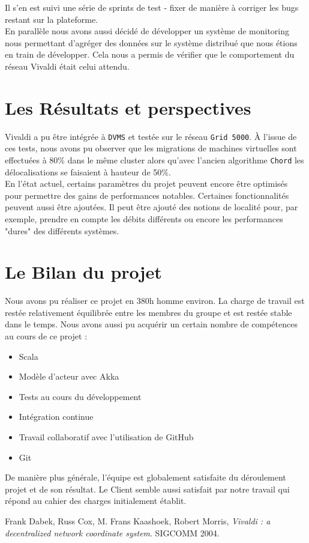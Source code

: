\documentclass[11pt,a4paper]{article}
\begin{document}
Il s'en est suivi une série de sprints de test - fixer de manière à corriger les bugs restant sur la plateforme.\\

En parallèle nous avons aussi décidé de développer un système de monitoring nous permettant d'agréger des données sur le système distribué que nous étions en train de développer. Cela nous a permis de vérifier que le comportement du réseau Vivaldi était celui attendu.

\section{Les Résultats et perspectives}
Vivaldi a pu être intégrée à \texttt{DVMS} et testée sur le réseau \texttt{Grid 5000}. À l'issue de ces tests, nous avons pu observer que les migrations de machines virtuelles sont effectuées à 80\% dans le même cluster alors qu'avec l'ancien algorithme \texttt{Chord} les délocalisations se faisaient à hauteur de 50\%.\\

En l'état actuel, certains paramètres du projet peuvent encore être optimisés pour permettre des gains de performances notables. Certaines fonctionnalités peuvent aussi être ajoutées. Il peut être ajouté des notions de localité pour, par exemple, prendre en compte les débits différents ou encore les performances "dures" des différents systèmes.

\section{Le Bilan du projet}
Nous avons pu réaliser ce projet en 380h homme environ. La charge de travail est restée relativement équilibrée entre les membres du groupe et est restée stable dans le temps. Nous avons aussi pu acquérir un certain nombre de compétences au cours de ce projet :
\begin{itemize}
\item Scala
\item Modèle d'acteur avec Akka
\item Tests au cours du développement
\item Intégration continue
\item Travail collaboratif avec l'utilisation de GitHub
\item Git \\
\end{itemize}

De manière plus générale, l'équipe est globalement satisfaite du déroulement projet et de son résultat. Le Client semble aussi satisfait par notre travail qui répond au cahier des charges initialement établit. 

\begin{thebibliography}{9}

  Frank Dabek, Russ Cox, M. Frans Kaashoek, Robert Morris,
  \emph{Vivaldi : a decentralized network coordinate system}.
  SIGCOMM 2004.

\end{thebibliography}
\end{document}
